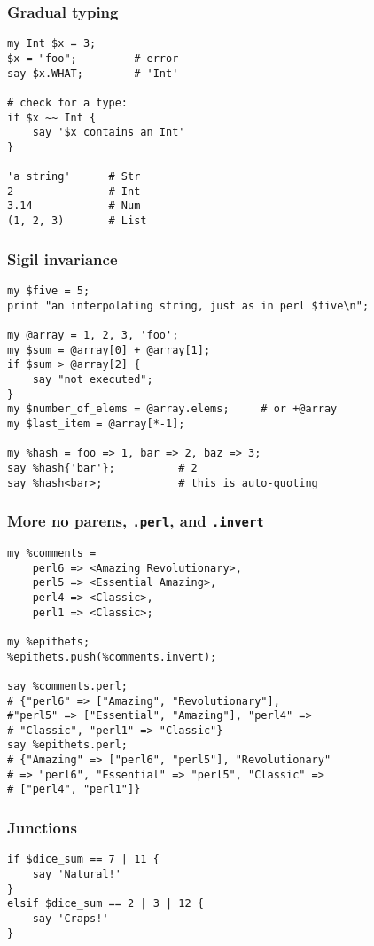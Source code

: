 \documentclass{beamer}
\begin{document}
\begin{frame}[fragile]
\frametitle{Gradual typing}
\begin{verbatim}
my Int $x = 3;
$x = "foo";         # error
say $x.WHAT;        # 'Int'

# check for a type:
if $x ~~ Int {
    say '$x contains an Int'
}

'a string'      # Str
2               # Int
3.14            # Num
(1, 2, 3)       # List
\end{verbatim}
\end{frame}

\begin{frame}[fragile]
\frametitle{Sigil invariance}
\begin{verbatim}
my $five = 5;
print "an interpolating string, just as in perl $five\n";

my @array = 1, 2, 3, 'foo';
my $sum = @array[0] + @array[1];
if $sum > @array[2] {
    say "not executed";
}
my $number_of_elems = @array.elems;     # or +@array
my $last_item = @array[*-1];

my %hash = foo => 1, bar => 2, baz => 3;
say %hash{'bar'};          # 2
say %hash<bar>;            # this is auto-quoting
\end{verbatim}
\end{frame}

\begin{frame}[fragile]
\frametitle{More no parens, \texttt{.perl}, and \texttt{.invert}}
\begin{verbatim}
my %comments =
    perl6 => <Amazing Revolutionary>,
    perl5 => <Essential Amazing>,
    perl4 => <Classic>,
    perl1 => <Classic>;

my %epithets;
%epithets.push(%comments.invert);

say %comments.perl;
# {"perl6" => ["Amazing", "Revolutionary"],
#"perl5" => ["Essential", "Amazing"], "perl4" =>
# "Classic", "perl1" => "Classic"}
say %epithets.perl;
# {"Amazing" => ["perl6", "perl5"], "Revolutionary"
# => "perl6", "Essential" => "perl5", "Classic" =>
# ["perl4", "perl1"]}
\end{verbatim}
\end{frame}

\begin{frame}[fragile]
\frametitle{Junctions}
\begin{verbatim}
if $dice_sum == 7 | 11 {
    say 'Natural!'
}
elsif $dice_sum == 2 | 3 | 12 {
    say 'Craps!'
}
\end{verbatim}
\end{frame}
\end{document}
